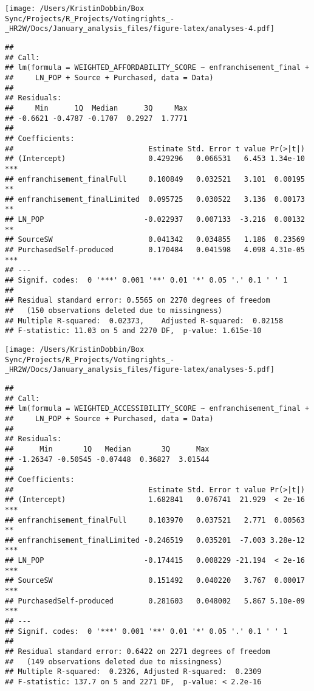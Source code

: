 \documentclass[
]{article}
\begin{document}
\texttt{[image: /Users/KristinDobbin/Box Sync/Projects/R\_Projects/Votingrights\_-\_HR2W/Docs/January\_analysis\_files/figure-latex/analyses-4.pdf]}

\begin{verbatim}
## 
## Call:
## lm(formula = WEIGHTED_AFFORDABILITY_SCORE ~ enfranchisement_final + 
##     LN_POP + Source + Purchased, data = Data)
## 
## Residuals:
##     Min      1Q  Median      3Q     Max 
## -0.6621 -0.4787 -0.1707  0.2927  1.7771 
## 
## Coefficients:
##                               Estimate Std. Error t value Pr(>|t|)    
## (Intercept)                   0.429296   0.066531   6.453 1.34e-10 ***
## enfranchisement_finalFull     0.100849   0.032521   3.101  0.00195 ** 
## enfranchisement_finalLimited  0.095725   0.030522   3.136  0.00173 ** 
## LN_POP                       -0.022937   0.007133  -3.216  0.00132 ** 
## SourceSW                      0.041342   0.034855   1.186  0.23569    
## PurchasedSelf-produced        0.170484   0.041598   4.098 4.31e-05 ***
## ---
## Signif. codes:  0 '***' 0.001 '**' 0.01 '*' 0.05 '.' 0.1 ' ' 1
## 
## Residual standard error: 0.5565 on 2270 degrees of freedom
##   (150 observations deleted due to missingness)
## Multiple R-squared:  0.02373,    Adjusted R-squared:  0.02158 
## F-statistic: 11.03 on 5 and 2270 DF,  p-value: 1.615e-10
\end{verbatim}

\texttt{[image: /Users/KristinDobbin/Box Sync/Projects/R\_Projects/Votingrights\_-\_HR2W/Docs/January\_analysis\_files/figure-latex/analyses-5.pdf]}

\begin{verbatim}
## 
## Call:
## lm(formula = WEIGHTED_ACCESSIBILITY_SCORE ~ enfranchisement_final + 
##     LN_POP + Source + Purchased, data = Data)
## 
## Residuals:
##      Min       1Q   Median       3Q      Max 
## -1.26347 -0.50545 -0.07448  0.36827  3.01544 
## 
## Coefficients:
##                               Estimate Std. Error t value Pr(>|t|)    
## (Intercept)                   1.682841   0.076741  21.929  < 2e-16 ***
## enfranchisement_finalFull     0.103970   0.037521   2.771  0.00563 ** 
## enfranchisement_finalLimited -0.246519   0.035201  -7.003 3.28e-12 ***
## LN_POP                       -0.174415   0.008229 -21.194  < 2e-16 ***
## SourceSW                      0.151492   0.040220   3.767  0.00017 ***
## PurchasedSelf-produced        0.281603   0.048002   5.867 5.10e-09 ***
## ---
## Signif. codes:  0 '***' 0.001 '**' 0.01 '*' 0.05 '.' 0.1 ' ' 1
## 
## Residual standard error: 0.6422 on 2271 degrees of freedom
##   (149 observations deleted due to missingness)
## Multiple R-squared:  0.2326, Adjusted R-squared:  0.2309 
## F-statistic: 137.7 on 5 and 2271 DF,  p-value: < 2.2e-16
\end{verbatim}
\end{document}
